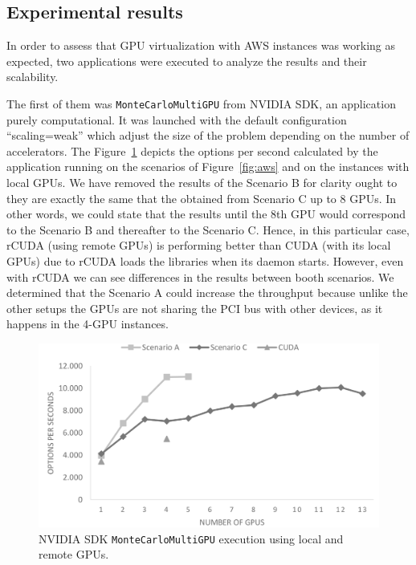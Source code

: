 \documentclass[a4paper,twoside]{article}
\begin{document}
\subsection{Experimental results}
In order to assess that GPU virtualization with AWS instances was working as expected, two applications were executed to analyze the results and their scalability.

The first of them was {\tt MonteCarloMultiGPU} from NVIDIA SDK, an application purely computational. 
It was launched with the default configuration ``scaling=weak'' which adjust the size of the problem depending on the number of accelerators.
The Figure~\ref{fig:mont-opt} depicts the options per second calculated by the application running on the scenarios of Figure~\ref{fig:aws} and on the instances with local GPUs. 
We have removed the results of the Scenario B for clarity ought to they are exactly the same that the obtained from Scenario C up to 8 GPUs. 
In other words, we could state that the results until the 8th GPU would correspond to the Scenario B and thereafter to the Scenario C.
Hence, in this particular case, rCUDA (using remote GPUs) is performing better than CUDA (with its local GPUs) due to rCUDA loads the libraries when its daemon starts.
However, even with rCUDA we can see differences in the results between booth scenarios. We determined that the Scenario A could increase the throughput because
unlike the other setups the GPUs are not sharing the PCI bus with other devices, as it happens in the 4-GPU instances.
\begin{figure}[htb]
  \centering
  \includegraphics[width=\linewidth]{images/mont.pdf}
  \caption{NVIDIA SDK {\tt MonteCarloMultiGPU} execution using local and remote GPUs.}
  \label{fig:mont-opt}
\end{figure}
\end{document}
